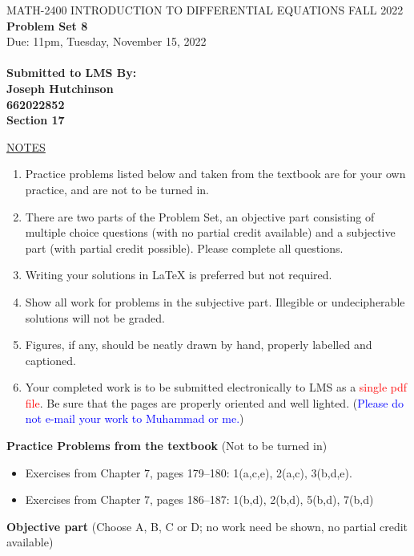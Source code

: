 \documentclass{article}
\begin{document}
\begin{center}
\large{ MATH-2400 \hspace{.27in}  INTRODUCTION TO DIFFERENTIAL EQUATIONS \hspace{.27in}FALL 2022\bigskip\\ {\bf Problem Set 8} \smallskip\\ Due: 11pm, Tuesday, November 15, 2022}\\
\textbf{\\Submitted to LMS By:\\ Joseph Hutchinson\\ 662022852 \\ Section 17 }
\end{center}

\bigskip\noindent
\underline{NOTES}
\begin{enumerate}
\item Practice problems listed below and taken from the textbook are for your own practice, and are not to be turned in.
\item There are two parts of the Problem Set, an objective part consisting of multiple choice questions (with no partial credit available) and a subjective part (with partial credit possible).  Please complete all questions.
\item Writing your solutions in {\LaTeX} is preferred but not required.
\item Show all work for problems in the subjective part.  Illegible or undecipherable solutions will not be graded. 
\item Figures, if any, should be neatly drawn by hand, properly labelled and captioned.  
\item Your completed work is to be submitted electronically to LMS  as a \textcolor{red}{single pdf file}. Be sure that the pages are properly oriented and well lighted.  (\textcolor{blue}{Please do not e-mail your work to Muhammad or me.})
\end{enumerate}

\bigskip\noindent
{\bf Practice Problems from the textbook} (Not to be turned in)
\begin{itemize}
\item
Exercises from Chapter 7, pages 179--180: 1(a,c,e), 2(a,c), 3(b,d,e).
\item
Exercises from Chapter 7, pages 186--187: 1(b,d), 2(b,d), 5(b,d), 7(b,d)
\end{itemize}

\bigskip\noindent
{\bf Objective part} (Choose A, B, C or D; no work need be shown, no partial credit available)
\end{document}

